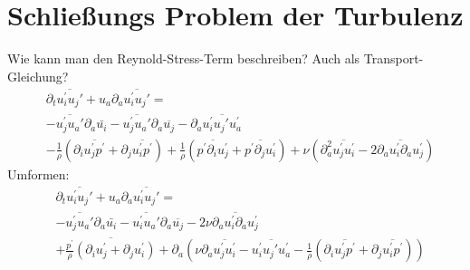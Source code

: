 \documentclass[11pt,t]{beamer}
\begin{document}
\section{Schließungs Problem der Turbulenz}
\begin{frame}
Wie kann man den Reynold-Stress-Term beschreiben? Auch als Transport-Gleichung?
\begin{align*}
&\partial_t\overline{u_i^{'}u_j{'}}+u_a\partial_a\overline{u_i^{'}u_j{'}} =\\& -\overline{u_j^{'}u_a{'}}\partial_a\bar{u_i}
-\overline{u_j^{'}u_a{'}}\partial_a\overline{u_j}-\partial_a\overline{u_i^{'}u_j{'}u_a^{'}} \\&- \frac{1}{\rho}(\partial_i\overline{u_j^{'}p^{'}}+\partial_j\overline{u_i^{'}p^{'}})+\frac{1}{\rho}(\overline{p^{'}\partial_iu_j^{'}}+\overline{p^{'}\partial_ju_i^{'}})+\nu(\partial_a^{2}\overline{u_j^{'}u_i^{'}}-2\overline{\partial_au_i^{'}\partial_au_j^{'}})
\end{align*}
Umformen:
\begin{align*}
&\partial_t\overline{u_i^{'}u_j{'}}+u_a\partial_a\overline{u_i^{'}u_j{'}} =\\& -\overline{u_j^{'}u_a{'}}\partial_a\bar{u_i}
-\overline{u_i^{'}u_a{'}}\partial_a\overline{u_j}- 2\nu\overline{\partial_au_i^{'}\partial_au_j^{'}}\\&+\overline{\frac{p^{'}}{\rho}(\partial_iu_j^{'}+\partial_ju_i^{'})}+\partial_a (\nu\partial_a\overline{u_j^{'}u_i^{'}} -\overline{u_i^{'}u_j{'}u_a^{'}}-\frac{1}{\rho}(\partial_i\overline{u_j^{'}p^{'}}+\partial_j\overline{u_i^{'}p^{'}}))
\end{align*}
\end{frame}
\end{document}
